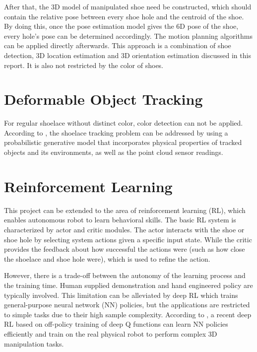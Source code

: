 After that, the 3D model of manipulated shoe need be constructed, which should contain the relative pose between every shoe hole and the centroid of the shoe. By doing this, once the pose estimation model gives the 6D pose of the shoe, every hole's pose can be determined accordingly. The motion planning algorithms can be applied directly afterwards. This approach is a combination of shoe detection, 3D location estimation and 3D orientation estimation discussed in this report. It is also not restricted by the color of shoes.

\section{Deformable Object Tracking}
For regular shoelace without distinct color, color detection can not be applied. According to \citep{deformable_track}, the shoelace tracking problem can be addressed by using a probabilistic generative model that incorporates physical properties of tracked objects and its environments, as well as the point cloud sensor readings. 

\section{Reinforcement Learning}
This project can be extended to the area of reinforcement learning (RL), which enables autonomous robot to learn behavioral skills. The basic RL system is characterized by actor and critic modules. The actor interacts with the shoe or shoe hole by selecting system actions given a specific input state. While the critic provides the feedback about how successful the actions were (such as how close the shoelace and shoe hole were), which is used to refine the action.

However, there is a trade-off between the autonomy of the learning process and the training time. Human supplied demonstration and hand engineered policy are typically involved. This limitation can be alleviated by deep RL which trains general-purpose neural network (NN) policies, but the applications are restricted to simple tasks due to their high sample complexity. According to \citep{reinforcementl}, a recent deep RL based on off-policy training of deep Q functions can learn NN policies efficiently and train on the real physical robot to perform complex 3D manipulation tasks.